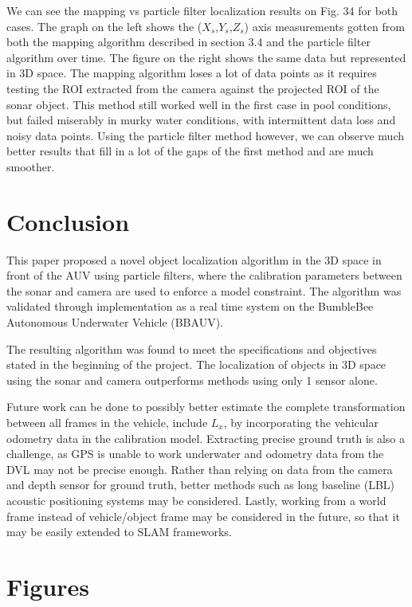 \documentclass[15pt]{article}
\newcommand{\XSonar}{$\si{\textit{X}_{s}}$\xspace}
\newcommand{\YSonar}{$\si{\textit{Y}_{s}}$\xspace}
\newcommand{\ZSonar}{$\si{\textit{Z}_{s}}$\xspace}
\begin{document}
We can see the mapping vs particle filter localization results on Fig. 34 for both cases. The graph on the left shows the (\XSonar,\YSonar,\ZSonar) axis measurements gotten from both the mapping algorithm described in section 3.4 and the particle filter algorithm over time. The figure on the right shows the same data but represented in 3D space. The mapping algorithm loses a lot of data points as it requires testing the ROI extracted from the camera against the projected ROI of the sonar object. This method still worked well in the first case in pool conditions, but failed miserably in murky water conditions, with intermittent data loss and noisy data points. Using the particle filter method however, we can observe much better results that fill in a lot of the gaps of the first method and are much smoother.

\section{Conclusion}
This paper proposed a novel object localization algorithm in the 3D space in front of the AUV using particle filters, where the calibration parameters between the sonar and camera are used to enforce a model constraint. The algorithm was validated through implementation as a real time system on the BumbleBee Autonomous Underwater Vehicle (BBAUV).
 
The resulting algorithm was found to meet the specifications and objectives stated in the beginning of the project. The localization of objects in 3D space using the sonar and camera outperforms methods using only 1 sensor alone. 
 
Future work can be done to possibly better estimate the complete transformation between all frames in the vehicle, include $L_{x}$, by incorporating the vehicular odometry data in the calibration model. Extracting precise ground truth is also a challenge, as GPS is unable to work underwater and odometry data from the DVL may not be precise enough. Rather than relying on data from the camera and depth sensor for ground truth, better methods such as long baseline (LBL) acoustic positioning systems may be considered. Lastly, working from a world frame instead of vehicle/object frame may be considered in the future, so that it may be easily extended to SLAM frameworks. 


\clearpage
\newpage
\FloatBarrier
\begingroup\setlength{\belowcaptionskip}{-2pt}
\section{Figures}
\end{document}
